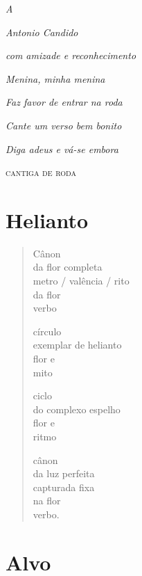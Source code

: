 \mbox{}
\vfill
\thispagestyle{empty}

\hfill\emph{A}

\hfill\emph{Antonio Candido}

\hfill\emph{com amizade e reconhecimento}

\pagebreak
\vfill
\thispagestyle{empty}

\hfill\emph{Menina, minha menina}

\hfill\emph{Faz favor de entrar na roda} 

\hfill\emph{Cante um verso bem bonito}

\hfill\emph{Diga adeus e vá-se embora}

\hfill\textsc{cantiga de roda}

\chapter{Helianto}

\begin{verse}
Cânon\\
da flor completa\\
metro / valência / rito\\
da flor\\
verbo

círculo\\
exemplar de helianto\\
flor e\\
mito

ciclo\\
do complexo espelho\\
flor e\\
ritmo

cânon\\
da luz perfeita\\
capturada fixa\\
na flor\\
verbo.
\end{verse}

\chapter{Alvo}

